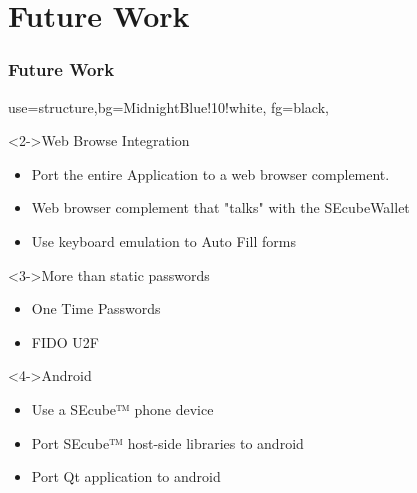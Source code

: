 \documentclass[14pt,usenames,dvipsnames]{beamer}
\begin{document}
\section{Future Work}
\begin{frame}
	\frametitle{Future Work}
	{
	 {use=structure,bg=MidnightBlue!10!white, fg=black,}
  \fontsize{14pt}{14}\selectfont

	
  \vspace{-0.3cm}	
	  
	\begin{block}<2->{Web Browse Integration}
		\begin{itemize}
		  \item Port the entire Application to a web browser complement.
			\item Web browser complement that "talks" with the SEcubeWallet
			\item Use keyboard emulation to Auto Fill forms
		\end{itemize}
	\end{block}

	\vspace{-0.1cm}	

	\begin{block}<3->{More than static passwords}
		\begin{itemize}
			\item One Time Passwords
			\item FIDO U2F
		\end{itemize}
	\end{block}
	
	\vspace{-0.1cm}	
	
	\begin{block}<4->{Android}
		\begin{itemize}
			\item Use a SEcube™ phone device
			\item Port SEcube™ host-side libraries to android
			\item Port Qt application to android
		\end{itemize}
	\end{block}	
	}
	
\end{frame}
\end{document}
